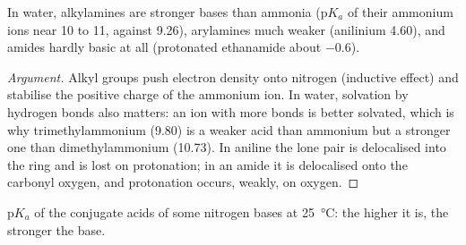 \begin{proposition}[Basicity]\label{prop:b2:amines:basicity}
In water, alkylamines are stronger bases than ammonia ($\mathrm pK_a$ of their ammonium ions
near 10 to 11, against 9.26), arylamines much weaker (anilinium 4.60), and amides hardly
basic at all (protonated ethanamide about $-0.6$).
\end{proposition}

\begin{proof}[Argument]
Alkyl groups push electron density onto nitrogen (inductive effect) and stabilise the
positive charge of the ammonium ion. In water, solvation by hydrogen bonds also matters: an
ion with more  bonds is better solvated, which is why trimethylammonium (9.80) is a
weaker acid than ammonium but a stronger one than dimethylammonium (10.73). In aniline the lone
pair is delocalised into the ring and is lost on protonation; in an amide it is delocalised
onto the carbonyl oxygen, and protonation occurs, weakly, on oxygen.
\end{proof}

\begin{omfigure}

{\small $\mathrm pK_a$ of the conjugate acids of some nitrogen bases at
\qty{25}{\degreeCelsius}: the higher it is, the stronger the base.}
\end{omfigure}

